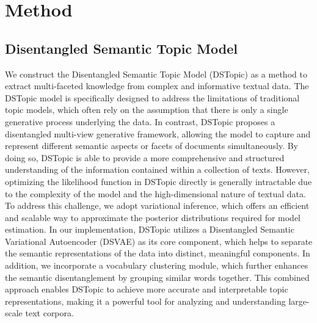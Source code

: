 
\chapter{Method} %

\label{Chapter3} %


\section{Disentangled Semantic Topic Model}

We construct the Disentangled Semantic Topic Model (DSTopic) as a method to extract multi-faceted knowledge from complex and informative textual data. The DSTopic model is specifically designed to address the limitations of traditional topic models, which often rely on the assumption that there is only a single generative process underlying the data. In contrast, DSTopic proposes a disentangled multi-view generative framework, allowing the model to capture and represent different semantic aspects or facets of documents simultaneously. By doing so, DSTopic is able to provide a more comprehensive and structured understanding of the information contained within a collection of texts. However, optimizing the likelihood function in DSTopic directly is generally intractable due to the complexity of the model and the high-dimensional nature of textual data. To address this challenge, we adopt variational inference, which offers an efficient and scalable way to approximate the posterior distributions required for model estimation. In our implementation, DSTopic utilizes a Disentangled Semantic Variational Autoencoder (DSVAE) as its core component, which helps to separate the semantic representations of the data into distinct, meaningful components. In addition, we incorporate a vocabulary clustering module, which further enhances the semantic disentanglement by grouping similar words together. This combined approach enables DSTopic to achieve more accurate and interpretable topic representations, making it a powerful tool for analyzing and understanding large-scale text corpora.


